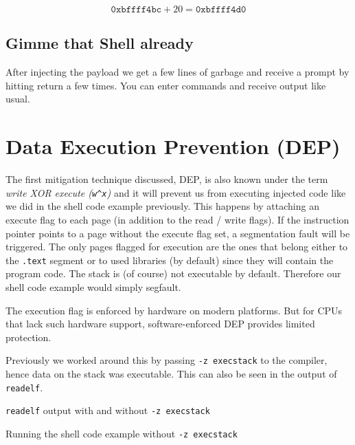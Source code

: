 \documentclass[article]{uibk}
\begin{document}
\[\texttt{0xbffff4bc} + 20 = \texttt{0xbffff4d0}\]

\subsection{Gimme that Shell already}


After injecting the payload we get a few lines of garbage and receive a prompt
by hitting return a few times. You can enter commands and receive output like
usual.

\section{Data Execution Prevention (DEP)}

The first mitigation technique discussed, DEP, is also known under the term
\textit{write XOR execute (\texttt{w\^{}x})} and it will prevent us from
executing injected code like we did in the shell code example previously. This
happens by attaching an execute flag to each page (in addition to the read /
write flags). If the instruction pointer points to a page without the execute
flag set, a segmentation fault will be triggered. The only pages flagged for
execution are the ones that belong either to the \texttt{.text} segment or to
used libraries (by default) since they will contain the program code. The stack
is (of course) not executable by default. Therefore our shell code example
would simply segfault.

The execution flag is enforced by hardware on modern platforms. But for CPUs
that lack such hardware support, software-enforced DEP provides limited
protection.~\cite{wiki:dep}

Previously we worked around this by passing \texttt{-z execstack} to the
compiler, hence data on the stack was executable. This can also be seen in the
output of \texttt{readelf}.

\begin{listing}[h!]
    \caption{\texttt{readelf} output with and without \texttt{-z execstack}}
    \label{src:dep_readelf}
\end{listing}

\begin{listing}[h!]
    \caption{Running the shell code example without \texttt{-z execstack}}
    \label{src:dep_shell_code}
\end{listing}
\end{document}
